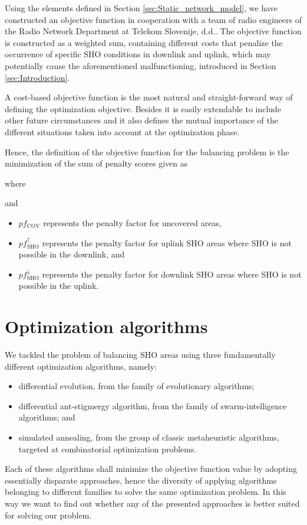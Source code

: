 Using the elements defined in Section \ref{sec:Static_network_model},
we have constructed an objective function in cooperation with a team
of radio engineers of the Radio Network Department at Telekom Slovenije,
d.d.. The objective function is constructed as a weighted sum, containing
different costs that penalize the occurrence of specific SHO conditions
in downlink and uplink, which may potentially cause the aforementioned
malfunctioning, introduced in Section \ref{sec:Introduction}.

A cost-based objective function is the most natural and straight-forward
way of defining the optimization objective. Besides it is easily extendable
to include other future circumstances and it also defines the mutual
importance of the different situations taken into account at the optimization
phase.

Hence, the definition of the objective function for the balancing
problem is the minimization of the sum of penalty scores given as



where 

and
\begin{itemize}
\item $pf_{\mathrm{COV}}$ represents the penalty factor for uncovered areas,
\item $pf_{\mathrm{SHO}}^{\uparrow}$ represents the penalty factor for
uplink SHO areas where SHO is not possible in the downlink, and
\item $pf_{\mathrm{SHO}}^{\downarrow}$ represents the penalty factor for
downlink SHO areas where SHO is not possible in the uplink.
\end{itemize}

\section{Optimization algorithms \label{sec:Optimization-algorithms}}

We tackled the problem of balancing SHO areas using three fundamentally
different optimization algorithms, namely:
\begin{itemize}
\item differential evolution, from the family of evolutionary algorithms;
\item differential ant-stigmergy algorithm, from the family of swarm-intelligence
algorithms; and
\item simulated annealing, from the group of classic metaheuristic algorithms,
targeted at combinatorial optimization problems.
\end{itemize}
Each of these algorithms shall minimize the objective function value
by adopting essentially disparate approaches, hence the diversity
of applying algorithms belonging to different families to solve the
same optimization problem. In this way we want to find out whether
any of the presented approaches is better suited for solving our problem.


